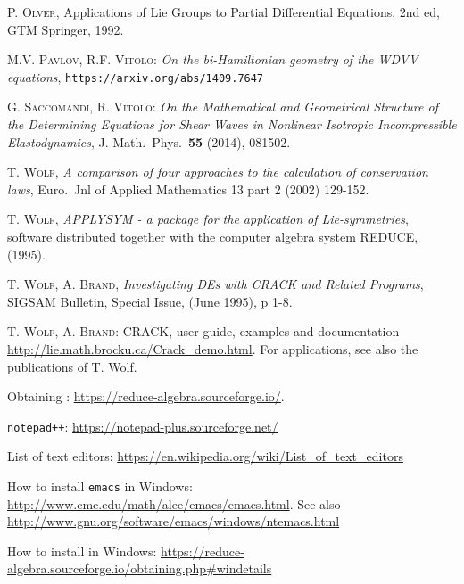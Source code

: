\begin{thebibliography}{999}
 \textsc{P. Olver}, Applications of Lie Groups to Partial
  Differential Equations, 2nd ed, GTM Springer, 1992.

 \textsc{M.V. Pavlov, R.F. Vitolo}: \emph{On the bi-Hamiltonian
    geometry of the WDVV equations}, \texttt{https://arxiv.org/abs/1409.7647}

 \textsc{G. Saccomandi, R. Vitolo}: \emph{On the Mathematical
    and Geometrical Structure of the Determining Equations for Shear Waves in
    Nonlinear Isotropic Incompressible Elastodynamics}, J. Math.\ Phys.\
  \textbf{55} (2014), 081502.

 \textsc{T. Wolf}, \emph{A comparison of four approaches to the
    calculation of conservation laws}, Euro.\ Jnl of Applied Mathematics 13
  part 2 (2002) 129-152.

 \textsc{T. Wolf}, \emph{APPLYSYM - a package for the
    application of Lie-symmetries}, software distributed together with the
  computer algebra system REDUCE, (1995).

 \textsc{T. Wolf, A. Brand}, \emph{Investigating DEs with CRACK
    and Related Programs}, SIGSAM Bulletin, Special Issue, (June 1995), p 1-8.

 \textsc{T. Wolf, A. Brand}: CRACK, user guide, examples and
    documentation \url{http://lie.math.brocku.ca/Crack_demo.html}. For
    applications, see also the publications of T. Wolf.


 Obtaining \REDUCE: \url{https://reduce-algebra.sourceforge.io/}.


 \texttt{notepad++}:
    \url{https://notepad-plus.sourceforge.net/}

 List of text editors:
    \url{https://en.wikipedia.org/wiki/List_of_text_editors}

 How to install \texttt{emacs} in Windows:
    \url{http://www.cmc.edu/math/alee/emacs/emacs.html}. See also
    \url{http://www.gnu.org/software/emacs/windows/ntemacs.html}

 How to install \REDUCE in Windows:
    \url{https://reduce-algebra.sourceforge.io/obtaining.php#windetails}


\end{thebibliography}
